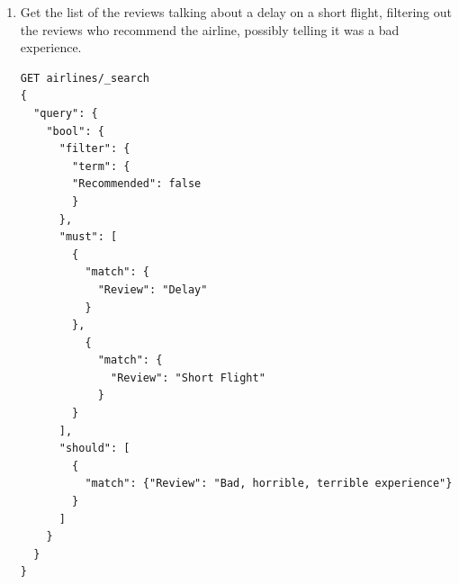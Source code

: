 \documentclass{Configuration_Files/PoliMi3i_thesis}
\begin{document}
\begin{enumerate}
\begin{figure}[H]
\end{figure}

\newpage

    \item Get the list of the reviews talking about a delay on a short flight, filtering out the reviews who recommend the airline, possibly telling it was a bad experience.

\begin{verbatim}
GET airlines/_search
{
  "query": {
    "bool": {
      "filter": {
        "term": {
        "Recommended": false
        }
      },
      "must": [
        {
          "match": {
            "Review": "Delay"
          }
        }, 
          {
            "match": {
              "Review": "Short Flight"
            }
        }
      ],
      "should": [
        {
          "match": {"Review": "Bad, horrible, terrible experience"}
        }
      ]
    }
  }
}
\end{verbatim}

\begin{figure}[H]
    \centering
    \\
    

\end{figure}
\end{enumerate}
\end{document}
